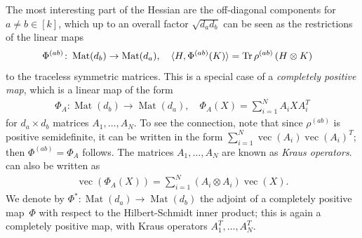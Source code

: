 \documentclass[aos]{imsart}
\theoremstyle{definition}
\numberwithin{equation}{section}
\DeclareMathOperator{\Mat}{Mat}
\DeclareMathOperator{\tr}{Tr}
\DeclareMathOperator{\PD}{PD}
\DeclareMathOperator{\vect}{vec}
\newcommand{\ot}{\otimes}
\begin{document}
The most interesting part of the Hessian are the off-diagonal components for $a\neq b\in[k]$, which up to an overall factor $\sqrt{d_a d_b}$ can be seen as the restrictions of the linear maps
\begin{align}\label{eq:hessian channel}
  \Phi^{(ab)} \colon \Mat(d_b) \to \Mat(d_a), \quad \braket{H, \Phi^{(ab)}(K)} &= \tr \rho^{(ab)} \left( H \ot K \right)
\end{align}
to the traceless symmetric matrices.
This is a special case of a \emph{completely positive map}, which is a linear map of the form
\begin{align}\label{eq:def cp}
  \Phi_A \colon \Mat(d_b) \to \Mat(d_a), \quad \Phi_A(X) = \sum_{i=1}^N A_i X A_i^T
\end{align}
for $d_a\times d_b$ matrices $A_1,\dots,A_N$.
To see the connection, note that since $\rho^{(ab)}$ is positive semidefinite, it can be written in the form $\sum_{i=1}^N \vect(A_i) \vect(A_i)^T$; then $\Phi^{(ab)} = \Phi_A$ follows.
The matrices $A_1,\dots,A_N$ are known as \emph{Kraus operators}.
 can also be written as
\begin{align}\label{eq:vec rep}
  \vect(\Phi_A(X)) = \sum_{i=1}^N (A_i \ot A_i) \vect(X).
\end{align}
We denote by $\Phi^*\colon\Mat(d_a)\to\Mat(d_b)$ the adjoint of a completely positive map~$\Phi$ with respect to the Hilbert-Schmidt inner product; this is again a completely positive map, with Kraus operators $A_1^T,\dots,A_N^T$.
\end{document}
